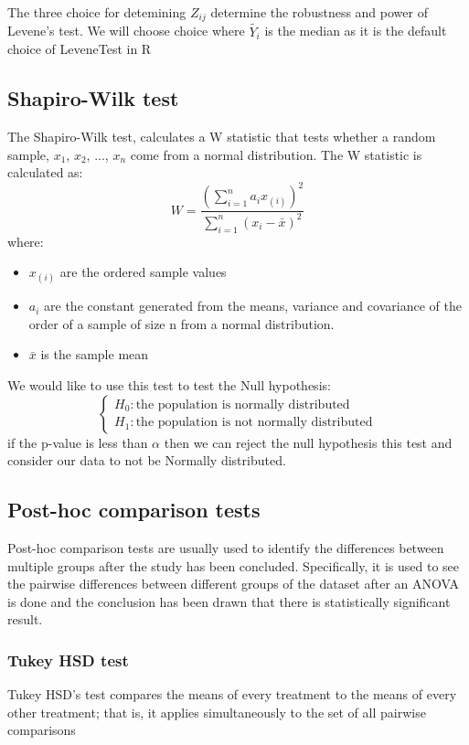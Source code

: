 The three choice for detemining $Z_{ij}$ determine the robustness and power of Levene's test. We will choose choice where $\tilde{Y_i}$ is the median as it is the default choice of LeveneTest in R

\subsection{Shapiro-Wilk test}
The Shapiro-Wilk test, calculates a W statistic that tests whether a random sample, $x_1$, $x_2$, ..., $x_n$ come from a normal distribution. 
The W statistic is calculated as:
\[W = \frac{(\sum_{i=1}^{n}a_ix_{(i)})^2}{\sum_{i=1}^{n}(x_i-\bar{x})^2}\]
where:
\begin{itemize}
    \item $x_{(i)}$ are the ordered sample values
    \item $a_i$ are the constant generated from the means, variance and covariance of the order of a sample of size n from a normal distribution.
    \item $\bar{x}$ is the sample mean
\end{itemize}
We would like to use this test to test the Null hypothesis:
\[
\begin{cases}
    H_0: \text{the population is normally distributed} \\
    H_1: \text{the population is not normally distributed}
\end{cases}
\]
if the p-value is less than $\alpha$ then we can reject the null hypothesis this test and consider our data to not be Normally distributed.

\subsection{Post-hoc comparison tests}

Post-hoc comparison tests are usually used to identify the differences between multiple groups after the study has been concluded.
Specifically, it is used to see the pairwise differences between different groups of the dataset after an ANOVA is done and the conclusion
has been drawn that there is statistically significant result.\cite{foster22}

\subsubsection{Tukey HSD test}

Tukey HSD's test compares the means of every treatment to the means of every other treatment; 
that is, it applies simultaneously to the set of all pairwise comparisons


